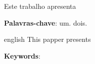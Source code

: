 \documentclass[
	12pt,				%
	openright,			%
	oneside,			%
	a4paper,			%
	chapter=TITLE,		%
	english,			%
	french,				%
	spanish,			%
	brazil				%
	]{abntex2}
\begin{document}
\setlength{\absparsep}{18pt} %
\begin{resumo}
    Este trabalho apresenta

    \textbf{Palavras-chave}: um. dois.
\end{resumo}

\begin{resumo}[Abstract]
 \begin{otherlanguage*}{english}
    This papper presents

   \vspace{\onelineskip}

   \noindent
   \textbf{Keywords}:
 \end{otherlanguage*}
\end{resumo}


\listoffigures*
\cleardoublepage




\cleardoublepage

\tableofcontents*
\cleardoublepage

\textual
\end{document}
